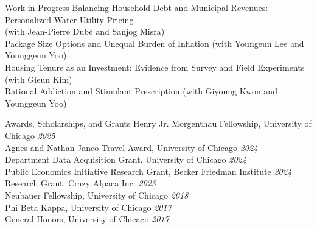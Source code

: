 \documentclass{resume} %
\begin{document}
	\begin{rSection}{Work in Progress}
		Balancing Household Debt and Municipal Revenues: Personalized Water Utility Pricing \\ (with Jean-Pierre Dub\'e and Sanjog Misra) \\
		Package Size Options and Unequal Burden of Inflation (with Youngeun Lee and Younggeun Yoo) \\
		Housing Tenure as an Investment: Evidence from Survey and Field Experiments (with Gieun Kim) \\
		Rational Addiction and Stimulant Prescription (with Giyoung Kwon and Younggeun Yoo)
	\end{rSection}

	\begin{rSection}{Awards, Scholarships, and Grants}
		Henry Jr. Morgenthau Fellowship, University of Chicago \hfill {\em 2025} \\
		Agnes and Nathan Janco Travel Award, University of Chicago \hfill {\em 2024} \\
		Department Data Acquisition Grant, University of Chicago \hfill {\em 2024} \\
		Public Economics Initiative Research Grant, Becker Friedman Institute \hfill {\em 2024} \\
		Research Grant, Crazy Alpaca Inc. \hfill {\em 2023} \\
		Neubauer Fellowship, University of Chicago \hfill {\em 2018} \\
		Phi Beta Kappa, University of Chicago \hfill {\em 2017} \\
		General Honors, University of Chicago \hfill {\em 2017}
	\end{rSection}
\end{document}
